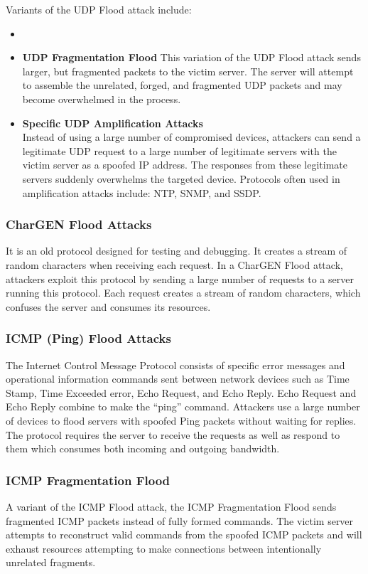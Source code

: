 \documentclass[a4paper, 12pt]{report} %
\begin{document}
        Variants of the UDP Flood attack include:
        \begin{itemize}
            \item 
            \item \textbf{UDP Fragmentation Flood} This variation of the UDP Flood attack sends larger, but fragmented packets to the victim server. The server will attempt to assemble the unrelated, forged, and fragmented UDP packets and may become overwhelmed in the process.
            \item \textbf{Specific UDP Amplification Attacks} \\ Instead of using a large number of compromised devices, attackers can send a legitimate UDP request to a large number of legitimate servers with the victim server as a spoofed IP address. The responses from these legitimate servers suddenly overwhelms the targeted device. Protocols often used in amplification attacks include: NTP, SNMP, and SSDP.
            
        \end{itemize}


        \subsubsection{CharGEN Flood Attacks}
        It is an old protocol designed for testing and debugging. It creates a stream of random characters when receiving each request. In a CharGEN Flood attack, attackers exploit this protocol by sending a large number of requests to a server running this protocol. Each request creates a stream of random characters, which confuses the server and consumes its resources.

        \subsubsection{ICMP (Ping) Flood Attacks}
        The Internet Control Message Protocol consists of specific error messages and operational information commands sent between network devices such as Time Stamp, Time Exceeded error, Echo Request, and Echo Reply. Echo Request and Echo Reply combine to make the “ping” command.
        Attackers use a large number of devices to flood servers with spoofed Ping packets without waiting for replies. The protocol requires the server to receive the requests as well as respond to them which consumes both incoming and outgoing bandwidth.

        \subsubsection{ICMP Fragmentation Flood}
        A variant of the ICMP Flood attack, the ICMP Fragmentation Flood sends fragmented ICMP packets instead of fully formed commands. The victim server attempts to reconstruct valid commands from the spoofed ICMP packets and will exhaust resources attempting to make connections between intentionally unrelated fragments.
\end{document}
